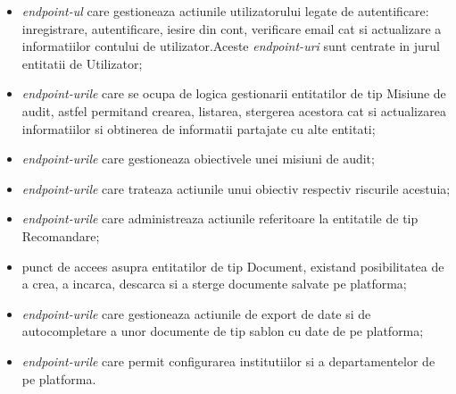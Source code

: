 \begin{itemize}
	
	\item \textit{endpoint-ul} care gestioneaza actiunile utilizatorului legate de autentificare: inregistrare, autentificare, iesire din cont, verificare email cat si actualizare a informatiilor contului de utilizator.Aceste \textit{endpoint-uri} sunt centrate in jurul entitatii de Utilizator;
	
	\item \textit{endpoint-urile} care se ocupa de logica gestionarii entitatilor de tip Misiune de audit, astfel permitand crearea, listarea, stergerea acestora cat si actualizarea informatiilor si obtinerea de informatii partajate cu alte entitati;
	
	\item \textit{endpoint-urile} care gestioneaza obiectivele unei misiuni de audit;
	
	\item \textit{endpoint-urile} care trateaza actiunile unui obiectiv respectiv riscurile acestuia;
	
	\item \textit{endpoint-urile} care administreaza actiunile referitoare la entitatile de tip Recomandare;
	
	\item punct de accees asupra entitatilor de tip Document, existand posibilitatea de a crea, a incarca, descarca si a sterge documente salvate pe platforma;
	
	\item \textit{endpoint-urile} care gestioneaza actiunile de export de date si de autocompletare a unor documente de tip sablon cu date de pe platforma;
	
	\item \textit{endpoint-urile} care permit configurarea institutiilor si a departamentelor de pe platforma.
	
\end{itemize} 


	
 

